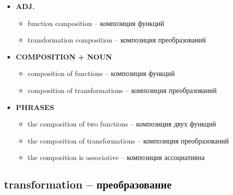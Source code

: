 \documentclass[a4paper, 10pt]{article}
\theoremstyle{definition}
\theoremstyle{plain}
\theoremstyle{remark}
\begin{document}
\begin{itemize}
    \item \textbf{ADJ.}
    \begin{itemize}
        \item function composition – композиция функций
        \item transformation composition – композиция преобразований
    \end{itemize}
    
    \item \textbf{COMPOSITION + NOUN}
    \begin{itemize}
        \item composition of functions – композиция функций
        \item composition of transformations – композиция преобразований
    \end{itemize}
    
    \item \textbf{PHRASES}
    \begin{itemize}
        \item the composition of two functions – композиция двух функций
        \item the composition of transformations – композиция преобразований
        \item the composition is associative – композиция ассоциативна
    \end{itemize}
\end{itemize}

\subsection{transformation – преобразование}
\end{document}
